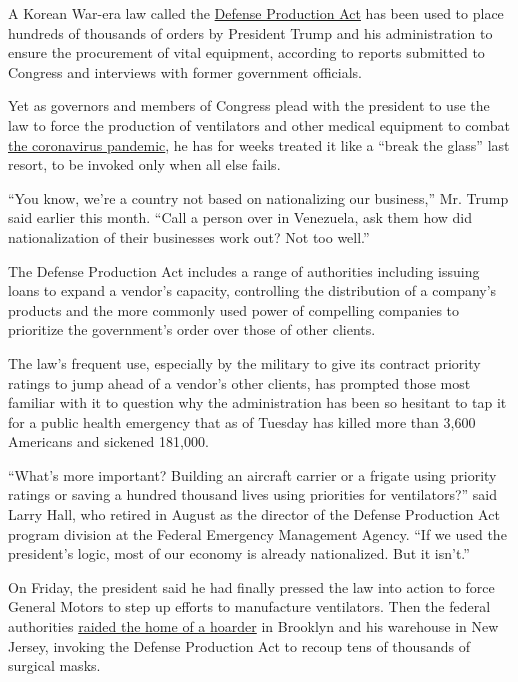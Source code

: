 A Korean War-era law called the
\href{https://www.nytimes3xbfgragh.onion/2020/07/22/us/politics/coronavirus-defense-production-act.html}{Defense
Production Act} has been used to place hundreds of thousands of orders
by President Trump and his administration to ensure the procurement of
vital equipment, according to reports submitted to Congress and
interviews with former government officials.

Yet as governors and members of Congress plead with the president to use
the law to force the production of ventilators and other medical
equipment to combat
\href{https://www.nytimes3xbfgragh.onion/news-event/coronavirus}{the
coronavirus pandemic}, he has for weeks treated it like a ``break the
glass'' last resort, to be invoked only when all else fails.

``You know, we're a country not based on nationalizing our business,''
Mr. Trump said earlier this month. ``Call a person over in Venezuela,
ask them how did nationalization of their businesses work out? Not too
well.''

The Defense Production Act includes a range of authorities including
issuing loans to expand a vendor's capacity, controlling the
distribution of a company's products and the more commonly used power of
compelling companies to prioritize the government's order over those of
other clients.

The law's frequent use, especially by the military to give its contract
priority ratings to jump ahead of a vendor's other clients, has prompted
those most familiar with it to question why the administration has been
so hesitant to tap it for a public health emergency that as of Tuesday
has killed more than 3,600 Americans and sickened 181,000.

``What's more important? Building an aircraft carrier or a frigate using
priority ratings or saving a hundred thousand lives using priorities for
ventilators?'' said Larry Hall, who retired in August as the director of
the Defense Production Act program division at the Federal Emergency
Management Agency. ``If we used the president's logic, most of our
economy is already nationalized. But it isn't.''

On Friday, the president said he had finally pressed the law into action
to force General Motors to step up efforts to manufacture ventilators.
Then the federal authorities
\href{https://www.justice.gov/usao-nj/pr/brooklyn-man-arrested-assaulting-fbi-agents-and-making-false-statements-about-his}{raided
the home of a hoarder} in Brooklyn and his warehouse in New Jersey,
invoking the Defense Production Act to recoup tens of thousands of
surgical masks.

